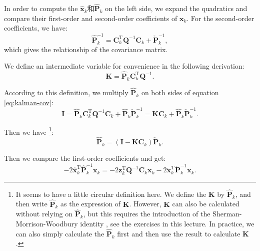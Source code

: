 In order to compute the $\hat{\mathbf{x}}_k$和$\mathbf{\hat{P}}_k$ on the left side, we expand the quadratics and compare their first-order and second-order coefficients of $\mathbf{x}_k$. For the second-order coefficients, we have: 
\begin{equation}
	\label{eq:kalman-cov}
	\hat{\mathbf{P}}_k^{ - 1} = \mathbf{C}_k^\mathrm{T}{\mathbf{Q}^{ - 1}}{\mathbf{C}_k} + \check {\mathbf{P}}_k^{ - 1},
\end{equation}
which gives the relationship of the covariance matrix.

We define an intermediate variable for convenience in the following derivation:
\begin{equation}
	\label{eq:kalman-K}
	\mathbf{K} = \mathbf{\hat{P}}_k \mathbf{C}_k^\mathrm{T} \mathbf{Q}^{-1}.
\end{equation}

According to this definition, we multiply $\mathbf{\hat{P}}_k$ on both sides of equation \eqref{eq:kalman-cov}: 
\begin{equation}
	\mathbf{I} = \mathbf{\hat{P}}_k \mathbf{C}_k^\mathrm{T} \mathbf{Q}^{-1} \mathbf{C}_k + \mathbf{\hat{P}}_k \mathbf{\check{P}}_k^{-1} = \mathbf{K} \mathbf{C}_k + \mathbf{\hat{P}}_k \mathbf{\check{P}}_k^{-1}.
\end{equation}

Then we have \footnote{It seems to have a little circular definition here. We define the $\mathbf{K}$ by $\mathbf{\hat{P}}_k$, and then write $\mathbf{\hat{P}}_k$ as the expression of $\mathbf{K}$. However, $\mathbf{K}$ can also be calculated without relying on $\mathbf{\hat{P}}_k$, but this requires the introduction of the Sherman-Morrison-Woodbury identity \cite{Sherman1950}, see the exercises in this lecture. In practice, we can also simply calculate the $\mathbf{\hat{P}}_k$ first and then use the result to calculate $\mathbf{K}$. }:
\begin{equation}
	\mathbf{\hat{P}}_k = ( \mathbf{I} - \mathbf{K} \mathbf{C}_k ) \mathbf{\check{P}}_k.
\end{equation}

Then we compare the first-order coefficients and get: 
\begin{equation}
	- 2\hat {\mathbf{x}}_k^\mathrm{T} \hat{\mathbf{P}}_k^{ - 1}{\mathbf{x}_k} =  - 2\mathbf{z}_k^\mathrm{T} {\mathbf{Q}^{ - 1}}{\mathbf{C}_k}{\mathbf{x}_k} - 2\mathbf{\check {x}}_k^\mathrm{T} \mathbf{\check {P}}_k^{ - 1}{\mathbf{x}_k}.
\end{equation}

